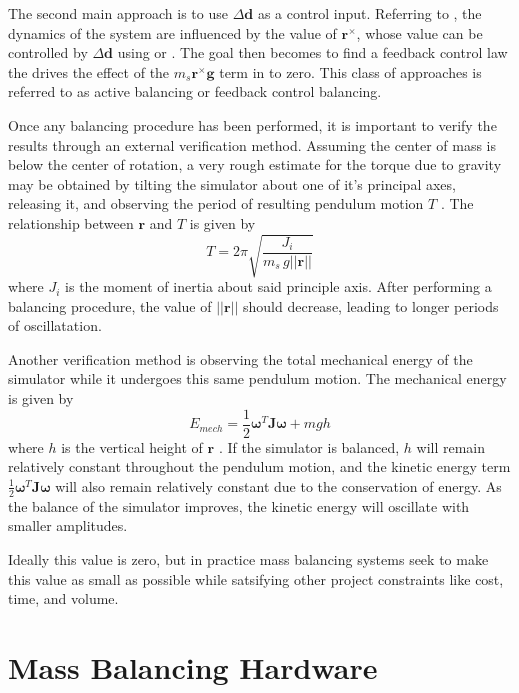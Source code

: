 The second main approach is to use $\Delta\bm{d}$ as a control input. Referring to , the dynamics of the system are influenced by the value of $\bm{r}^{\times}$, whose value can be controlled by $\Delta\bm{d}$ using  or . The goal then becomes to find a feedback control law the drives the effect of the $m_s\bm{r}^{\times}\bm{g}$ term in  to zero. This class of approaches is referred to as active balancing or feedback control balancing.

Once any balancing procedure has been performed, it is important to verify the results through an external verification method. Assuming the center of mass is below the center of rotation, a very rough estimate for the torque due to gravity may be obtained by tilting the simulator about one of it's principal axes, releasing it, and observing the period of resulting pendulum motion $T$ \cite{kim_automatic_2009}. The relationship between $\bm{r}$ and $T$ is given by
\begin{equation}
    T = 2\pi\sqrt{\frac{J_i}{m_s\,g||\bm{r}||}}
\end{equation}
where $J_i$ is the moment of inertia about said principle axis. After performing a balancing procedure, the value of $||\bm{r}||$ should decrease, leading to longer periods of oscillatation. 

Another verification method is observing the total mechanical energy of the simulator while it undergoes this same pendulum motion. The mechanical energy is given by
\begin{equation}
    E_{mech} = \frac{1}{2}\bm{\omega}^T\bm{J}\bm{\omega} + mgh
\end{equation}
where $h$ is the vertical height of $\bm{r}$ \cite{silva_filtering_2018}. If the simulator is balanced, $h$ will remain relatively constant throughout the pendulum motion, and the kinetic energy term $\frac{1}{2}\bm{\omega}^T\bm{J}\bm{\omega}$ will also remain relatively constant due to the conservation of energy. As the balance of the simulator improves, the kinetic energy will oscillate with smaller amplitudes.

Ideally this value is zero, but in practice mass balancing systems seek to make this value as small as possible while satsifying other project constraints like cost, time, and volume. 

\section{Mass Balancing Hardware}

